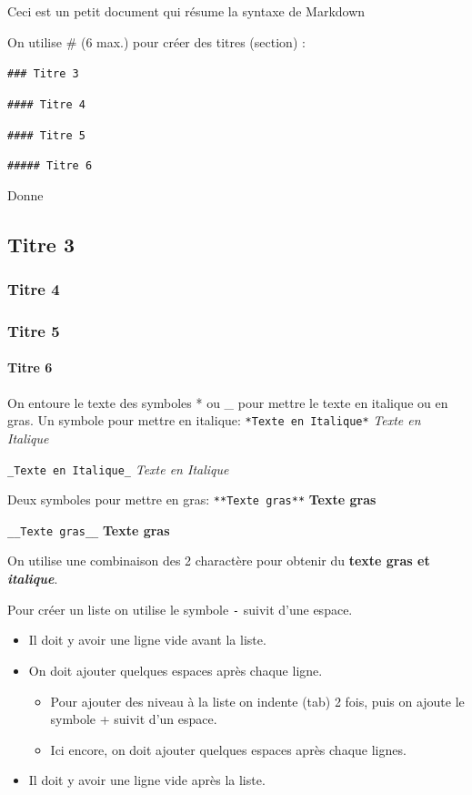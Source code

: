 \documentclass[12pt,]{book}
\providecommand{\tightlist}{%
  \setlength{\itemsep}{0pt}\setlength{\parskip}{0pt}}
\let\oldparagraph\paragraph
\renewcommand{\paragraph}[1]{\oldparagraph{#1}\mbox{}}
\begin{document}
Ceci est un petit document qui résume la syntaxe de Markdown

On utilise \# (6 max.) pour créer des titres (section) :

\texttt{\#\#\#\ Titre\ 3}

\texttt{\#\#\#\#\ Titre\ 4}

\texttt{\#\#\#\#\ Titre\ 5}

\texttt{\#\#\#\#\#\ Titre\ 6}

Donne

\hypertarget{titre-3}{%
\subsection{Titre 3}\label{titre-3}}

\hypertarget{titre-4}{%
\subsubsection{Titre 4}\label{titre-4}}

\hypertarget{titre-5}{%
\subsubsection{Titre 5}\label{titre-5}}

\hypertarget{titre-6}{%
\paragraph{Titre 6}\label{titre-6}}

On entoure le texte des symboles * ou \_ pour mettre le texte en italique ou en gras.
Un symbole pour mettre en italique:
\texttt{*Texte\ en\ Italique*}
\emph{Texte en Italique}

\texttt{\_Texte\ en\ Italique\_}
\emph{Texte en Italique}

Deux symboles pour mettre en gras:
\texttt{**Texte\ gras**}
\textbf{Texte gras}

\texttt{\_\_Texte\ gras\_\_}
\textbf{Texte gras}

On utilise une combinaison des 2 charactère pour obtenir du \textbf{texte gras et \emph{italique}}.

Pour créer un liste on utilise le symbole \texttt{-} suivit d'une espace.

\begin{itemize}
\tightlist
\item
  Il doit y avoir une ligne vide avant la liste.
\item
  On doit ajouter quelques espaces après chaque ligne.

  \begin{itemize}
  \tightlist
  \item
    Pour ajouter des niveau à la liste on indente (tab) 2 fois, puis on ajoute le symbole + suivit d'un espace.
  \item
    Ici encore, on doit ajouter quelques espaces après chaque lignes.
  \end{itemize}
\item
  Il doit y avoir une ligne vide après la liste.
\end{itemize}
\end{document}
